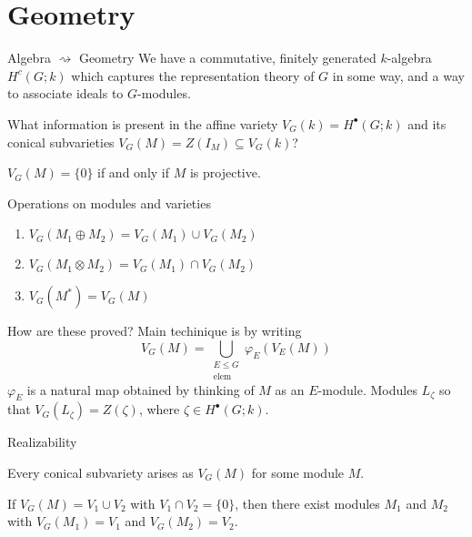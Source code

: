 \documentclass{beamer}
\theoremstyle{definition}
\begin{document}
 \section{Geometry}

 \begin{frame}{Algebra $\rightsquigarrow$ Geometry}\pause
   We have a commutative, finitely generated $k$-algebra $H^c(G;k)$ which captures the representation theory of $G$ in some way, and a way to associate ideals to $G$-modules.\pause

   \vspace{0.2in}
   What information is present in the affine variety $V_G(k) = H^\bullet(G;k)$ and its conical subvarieties $V_G(M) = Z(I_M) \subseteq V_G(k)$?\pause

   \vspace{0.2in}
   \begin{theorem}
     $V_G(M) = \{0\}$ if and only if $M$ is projective. \pause
   \end{theorem}
 \end{frame}

 \begin{frame}{Operations on modules and varieties} \pause
   \begin{theorem}
     \begin{enumerate}
     \item $V_G(M_1 \oplus M_2) = V_G(M_1) \cup V_G(M_2)$ \pause
     \item $V_G(M_1 \otimes M_2) = V_G(M_1) \cap V_G(M_2)$ \pause
     \item $V_G(M^*) = V_G(M)$ \pause
     \end{enumerate}
   \end{theorem}

   How are these proved? \pause Main techinique is by writing
   \[
V_G(M) = \bigcup_{\substack{E \leq G \\ \text{elem}}} \varphi_E ( V_E(M))
\]
$\varphi_E$ is a natural map obtained by thinking of $M$ as an $E$-module.
\pause
\vspace{0.2in}
Modules $L_\zeta$ so that $V_G(L_\zeta) = Z(\zeta)$, where $\zeta \in H^\bullet(G;k)$.
\end{frame}

\begin{frame}{Realizability}
\pause
  \begin{theorem}
    Every conical subvariety arises as $V_G(M)$ for some module $M$.
  \end{theorem}
\pause
  \vspace{0.4in}
  \begin{theorem}
    If $V_G(M) = V_1 \cup V_2$ with $V_1 \cap V_2 = \{0\}$, then there exist modules $M_1$ and $M_2$ with $V_G(M_1) = V_1$ and $V_G(M_2) = V_2$.
  \end{theorem}
  
\end{frame}
\end{document}
